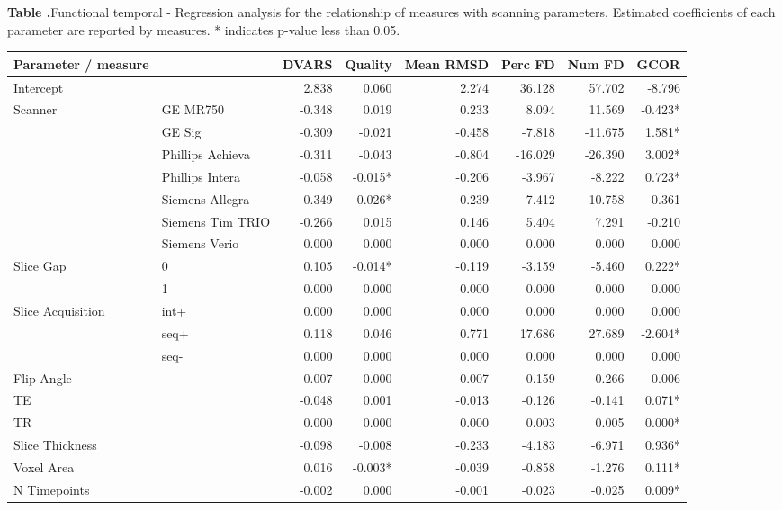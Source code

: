 \begin{table}
  \textbf{\label{func_temp_reg} Table .}{Functional temporal - Regression analysis for the relationship of measures with scanning parameters. Estimated coefficients of each parameter are reported by measures. * indicates p-value less than 0.05.}
  \begin{center}

    \begin{tabular}{ l l r r r r r r }
    \hline
    Parameter / measure & & DVARS & Quality & Mean RMSD & Perc FD & Num FD & GCOR \\ \hline
    Intercept & & 2.838 & 0.060 & 2.274 & 36.128 & 57.702 & -8.796 \\
    Scanner & GE MR750 & -0.348 & 0.019 & 0.233 & 8.094 & 11.569 & -0.423* \\
     & GE Sig & -0.309 & -0.021 & -0.458 & -7.818 & -11.675 & 1.581* \\
     & Phillips Achieva & -0.311 & -0.043 & -0.804 & -16.029 & -26.390 & 3.002* \\
     & Phillips Intera & -0.058 & -0.015* & -0.206 & -3.967 & -8.222 & 0.723* \\
     & Siemens Allegra & -0.349 & 0.026* & 0.239 & 7.412 & 10.758 & -0.361 \\
     & Siemens Tim TRIO & -0.266 & 0.015 & 0.146 & 5.404 & 7.291 & -0.210 \\
     & Siemens Verio & 0.000 & 0.000 & 0.000 & 0.000 & 0.000 & 0.000 \\
    Slice Gap & 0 & 0.105 & -0.014* & -0.119 & -3.159 & -5.460 & 0.222* \\
     & 1 & 0.000 & 0.000 & 0.000 & 0.000 & 0.000 & 0.000 \\
    Slice Acquisition & int+ & 0.000 & 0.000 & 0.000 & 0.000 & 0.000 & 0.000 \\
     & seq+ & 0.118 & 0.046 & 0.771 & 17.686 & 27.689 & -2.604* \\
     & seq- & 0.000 & 0.000 & 0.000 & 0.000 & 0.000 & 0.000 \\
    Flip Angle & & 0.007 & 0.000 & -0.007 & -0.159 & -0.266 & 0.006 \\
    TE & & -0.048 & 0.001 & -0.013 & -0.126 & -0.141 & 0.071* \\
    TR & & 0.000 & 0.000 & 0.000 & 0.003 & 0.005 & 0.000* \\
    Slice Thickness & & -0.098 & -0.008 & -0.233 & -4.183 & -6.971 & 0.936* \\
    Voxel Area & & 0.016 & -0.003* & -0.039 & -0.858 & -1.276 & 0.111* \\
    N Timepoints & & -0.002 & 0.000 & -0.001 & -0.023 & -0.025 & 0.009* \\
    \hline
    \end{tabular}
  \end{center}
\end{table}
